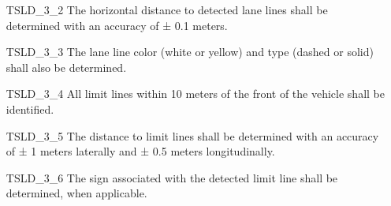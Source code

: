 \begin{itemize}
\begin{itemize}
        \item[TSLD\_3\_2] The horizontal distance to detected lane lines shall be determined with an accuracy of ± 0.1 meters.
        \item[TSLD\_3\_3] The lane line color (white or yellow) and type (dashed or solid) shall also be determined.
        \item[TSLD\_3\_4] All limit lines within 10 meters of the front of the vehicle shall be identified.
        \item[TSLD\_3\_5] The distance to limit lines shall be determined with an accuracy of ± 1 meters laterally and ± 0.5 meters longitudinally.
        \item[TSLD\_3\_6] The sign associated with the detected limit line shall be determined, when applicable.
    \end{itemize}
\end{itemize}